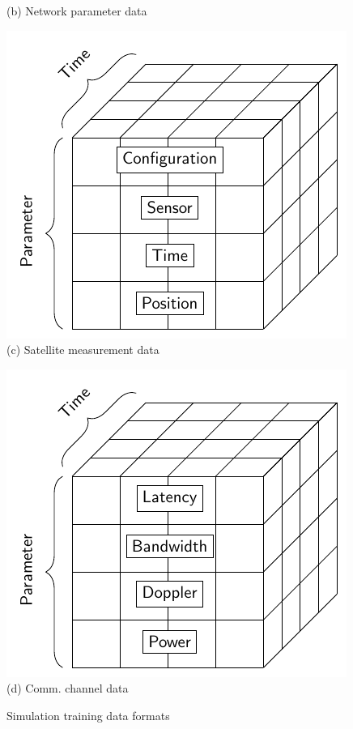 \documentclass[conference]{IEEEtran}
\begin{document}
\begin{figure}[t]
\begin{minipage}[b]{0.49\linewidth}
\begin{center}
      {\footnotesize(b) Network parameter data}
    \end{center}
  \end{minipage}
  \newline
  \begin{minipage}[b]{0.49\linewidth}
    \begin{center}
      \includegraphics[width=\textwidth]{images/meas2.pdf}
      {\footnotesize(c) Satellite measurement data}
    \end{center}
  \end{minipage}
  \begin{minipage}[b]{0.49\linewidth}
    \begin{center}
      \includegraphics[width=\textwidth]{images/comm.pdf}
      {\footnotesize(d) Comm. channel data}
    \end{center}
  \end{minipage}
  \caption{Simulation training data formats}
  \label{fig:data}
\end{figure}
\end{document}
